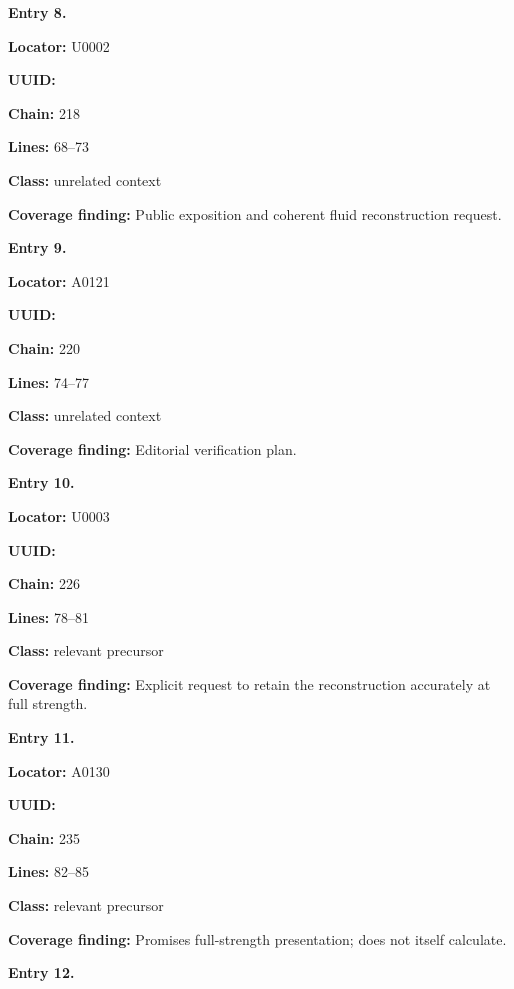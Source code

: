 \documentclass[10pt,a4paper,oneside]{report}
\begin{document}

\textbf{Entry 8.}

\textbf{Locator:} U0002

\textbf{UUID:} \protect{}

\textbf{Chain:} 218

\textbf{Lines:} 68--73

\textbf{Class:} unrelated context

\textbf{Coverage finding:} Public exposition and coherent fluid
reconstruction request.


\textbf{Entry 9.}

\textbf{Locator:} A0121

\textbf{UUID:} \protect{}

\textbf{Chain:} 220

\textbf{Lines:} 74--77

\textbf{Class:} unrelated context

\textbf{Coverage finding:} Editorial verification plan.


\textbf{Entry 10.}

\textbf{Locator:} U0003

\textbf{UUID:} \protect{}

\textbf{Chain:} 226

\textbf{Lines:} 78--81

\textbf{Class:} relevant precursor

\textbf{Coverage finding:} Explicit request to retain the reconstruction
accurately at full strength.


\textbf{Entry 11.}

\textbf{Locator:} A0130

\textbf{UUID:} \protect{}

\textbf{Chain:} 235

\textbf{Lines:} 82--85

\textbf{Class:} relevant precursor

\textbf{Coverage finding:} Promises full-strength presentation; does not
itself calculate.


\textbf{Entry 12.}
\end{document}
